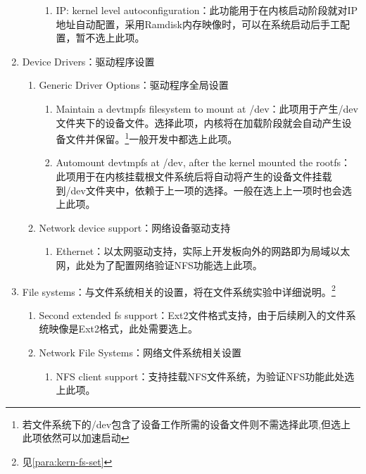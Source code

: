 \documentclass[hyperref,UTF8]{ctexart}
\begin{document}
\begin{enumerate}
\begin{enumerate}
\begin{enumerate}
            \item IP: kernel level autoconfiguration：此功能用于在内核启动阶段就对IP地址自动配置，采用Ramdisk内存映像时，可以在系统启动后手工配置，暂不选上此项。\label{item:ipautoconf}
        \end{enumerate}
    \end{enumerate}
    \item Device Drivers：驱动程序设置
    \begin{enumerate}
        \item Generic Driver Options：驱动程序全局设置
        \begin{enumerate}
            \item Maintain a devtmpfs filesystem to mount at /dev：此项用于产生/dev文件夹下的设备文件。选择此项，内核将在加载阶段就会自动产生设备文件并保留。\footnote{若文件系统下的/dev包含了设备工作所需的设备文件则不需选择此项,但选上此项依然可以加速启动}一般开发中都选上此项。
            \item Automount devtmpfs at /dev, after the kernel mounted the rootfs：此项用于在内核挂载根文件系统后将自动将产生的设备文件挂载到/dev文件夹中，依赖于上一项的选择。一般在选上上一项时也会选上此项。\label{item:devsup}
        \end{enumerate}
        \item Network device support：网络设备驱动支持
        \begin{enumerate}
            \item Ethernet：以太网驱动支持，实际上开发板向外的网路即为局域以太网，此处为了配置网络验证NFS功能选上此项。
        \end{enumerate}
    \end{enumerate}
    \item File systems：与文件系统相关的设置，将在文件系统实验中详细说明。\footnote{见\ref{para:kern-fs-set}}
    \begin{enumerate}
        \item Second extended fs support：Ext2文件格式支持，由于后续刷入的文件系统映像是Ext2格式，此处需要选上。\label{item:ext2set}
        \item Network File Systems：网络文件系统相关设置
        \begin{enumerate}
            \item NFS client support：支持挂载NFS文件系统，为验证NFS功能此处选上此项。\label{item:nfsset}
        \end{enumerate}
    \end{enumerate}
\end{enumerate}
\end{document}
